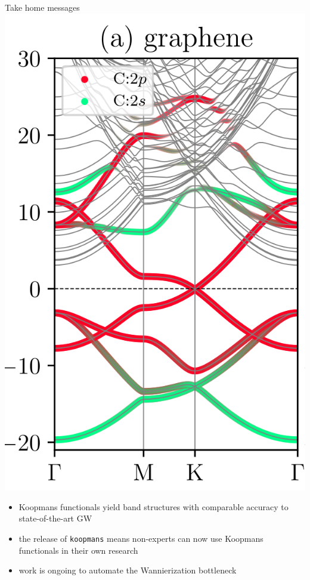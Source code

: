 \documentclass[xcolor=table,aspectratio=169]{beamer}
\numberwithin{equation}{section}
\begin{document}
\begin{frame}{Take home messages}
   \includegraphics[height=0.275\paperheight]{figures/proj_disentanglement_fig1a.png}
   \hfill

   \begin{itemize}
      \item Koopmans functionals yield band structures with comparable accuracy to state-of-the-art GW
      \item the release of \texttt{koopmans} means non-experts can now use Koopmans functionals in their own research
      \item work is ongoing to automate the Wannierization bottleneck
   \end{itemize}

\end{frame}
\end{document}
